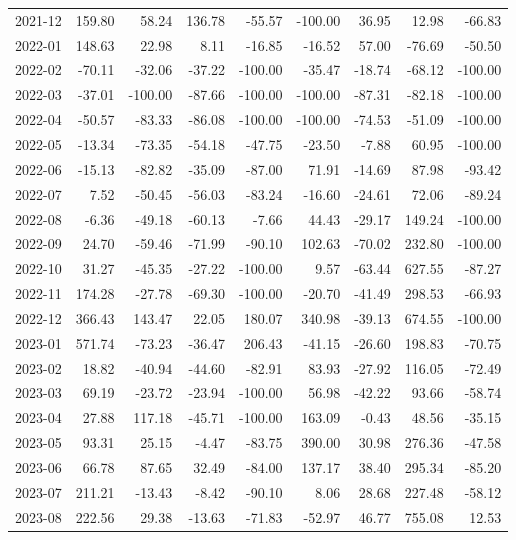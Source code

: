 \begin{table}[ht]
\begin{tabular}{lrrrrrrrr}
  2021-12 & 159.80 & 58.24 & 136.78 & -55.57 & -100.00 & 36.95 & 12.98 & -66.83 \\ 
  2022-01 & 148.63 & 22.98 & 8.11 & -16.85 & -16.52 & 57.00 & -76.69 & -50.50 \\ 
  2022-02 & -70.11 & -32.06 & -37.22 & -100.00 & -35.47 & -18.74 & -68.12 & -100.00 \\ 
  2022-03 & -37.01 & -100.00 & -87.66 & -100.00 & -100.00 & -87.31 & -82.18 & -100.00 \\ 
  2022-04 & -50.57 & -83.33 & -86.08 & -100.00 & -100.00 & -74.53 & -51.09 & -100.00 \\ 
  2022-05 & -13.34 & -73.35 & -54.18 & -47.75 & -23.50 & -7.88 & 60.95 & -100.00 \\ 
  2022-06 & -15.13 & -82.82 & -35.09 & -87.00 & 71.91 & -14.69 & 87.98 & -93.42 \\ 
  2022-07 & 7.52 & -50.45 & -56.03 & -83.24 & -16.60 & -24.61 & 72.06 & -89.24 \\ 
  2022-08 & -6.36 & -49.18 & -60.13 & -7.66 & 44.43 & -29.17 & 149.24 & -100.00 \\ 
  2022-09 & 24.70 & -59.46 & -71.99 & -90.10 & 102.63 & -70.02 & 232.80 & -100.00 \\ 
  2022-10 & 31.27 & -45.35 & -27.22 & -100.00 & 9.57 & -63.44 & 627.55 & -87.27 \\ 
  2022-11 & 174.28 & -27.78 & -69.30 & -100.00 & -20.70 & -41.49 & 298.53 & -66.93 \\ 
  2022-12 & 366.43 & 143.47 & 22.05 & 180.07 & 340.98 & -39.13 & 674.55 & -100.00 \\ 
  2023-01 & 571.74 & -73.23 & -36.47 & 206.43 & -41.15 & -26.60 & 198.83 & -70.75 \\ 
  2023-02 & 18.82 & -40.94 & -44.60 & -82.91 & 83.93 & -27.92 & 116.05 & -72.49 \\ 
  2023-03 & 69.19 & -23.72 & -23.94 & -100.00 & 56.98 & -42.22 & 93.66 & -58.74 \\ 
  2023-04 & 27.88 & 117.18 & -45.71 & -100.00 & 163.09 & -0.43 & 48.56 & -35.15 \\ 
  2023-05 & 93.31 & 25.15 & -4.47 & -83.75 & 390.00 & 30.98 & 276.36 & -47.58 \\ 
  2023-06 & 66.78 & 87.65 & 32.49 & -84.00 & 137.17 & 38.40 & 295.34 & -85.20 \\ 
  2023-07 & 211.21 & -13.43 & -8.42 & -90.10 & 8.06 & 28.68 & 227.48 & -58.12 \\ 
  2023-08 & 222.56 & 29.38 & -13.63 & -71.83 & -52.97 & 46.77 & 755.08 & 12.53 \\ 

\end{tabular}
\end{table}

